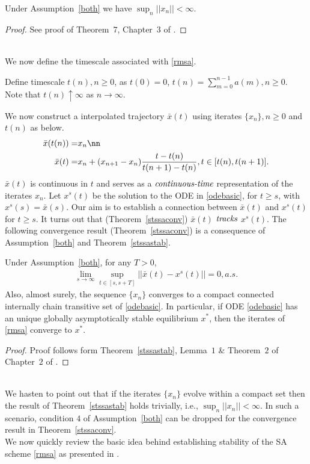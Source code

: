 \begin{theorem}\label{stssastab}
Under Assumption~\ref{both} we have $\sup_n ||x_n||<\infty$.
\end{theorem}
\begin{proof}
See proof of Theorem~$7$, Chapter~$3$ of \cite{SA}.
\end{proof}\\
We now define the timescale associated with \eqref{rmsa}.
\begin{definition}
Define timescale $t(n), n\geq0$, as $t(0)=0$, $t(n)=\sum^{n-1}_{m=0}a(m), n\geq0$. Note that $t(n)\uparrow \infty$ as $n\rightarrow \infty$.
\end{definition}
We now construct a interpolated trajectory $\bar{x}(t)$ using iterates $\{x_n\}, n\geq 0$ and $t(n)$ as below. 
\begin{align}\label{traj}
	\bar{x}(t(n))=&x_n\nn\\
	\bar{x}(t)=&x_n+(x_{n+1}-x_n)	\frac{t-t(n)}{t(n+1)-t(n)}, t \in [t(n), t(n+1)].
\end{align}
 $\bar{x}(t)$ is continuous in $t$ and serves as a $\emph{continuous-time}$ representation of the iterates $x_n$. Let $x^s(t)$ be the solution to the ODE in \eqref{odebasic}, for $t \geq s$, with $x^s(s)=\bar{x}(s)$. Our aim is to establish a connection between $\bar{x}(t)$ and $x^s(t)$ for $t\geq s$. It turns out that (Theorem~\ref{stssaconv}) $\bar{x}(t)$ $\emph{tracks}$ $x^s(t)$. The following convergence result (Theorem~\ref{stssaconv}) is a consequence of Assumption~\ref{both} and Theorem~\ref{stssastab}. 
\begin{theorem}\label{stssaconv}
Under Assumption~\ref{both}, for any $T>0$,
\begin{align}
\lim_{s\rightarrow \infty}\sup_{t\in[s,s+T]}||\bar{x}(t)-x^s(t)|| =0, a.s.
\end{align}
Also, almost surely, the sequence $\{x_n\}$ converges to a compact connected internally chain transitive set of \eqref{odebasic}. In particular, if ODE \eqref{odebasic} has an unique globally asymptotically stable equilibrium $x^*$, then the iterates of \eqref{rmsa} converge to $x^*$.
\end{theorem}
\begin{proof}
Proof follows form Theorem~\ref{stssastab}, Lemma~$1$ \& Theorem~$2$ of Chapter~$2$ of \cite{SA}.
\end{proof}\\
We hasten to point out that if the iterates $\{x_n\}$ evolve within a compact set then the result of Theorem~\ref{stssastab} holds trivially, i.e., $\sup_n||x_n||<\infty$. In such a scenario, condition $4$ of Assumption~\ref{both} can be dropped for the convergence result in Theorem~\ref{stssaconv}.\\
We now quickly review the basic idea behind establishing stability of the SA scheme \eqref{rmsa} as presented in \cite{SA}.
